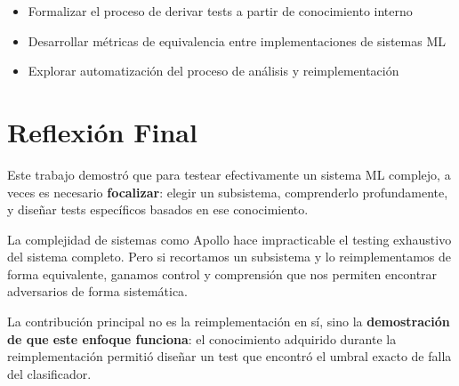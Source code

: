 \begin{itemize}
    \item Formalizar el proceso de derivar tests a partir de conocimiento interno
    \item Desarrollar métricas de equivalencia entre implementaciones de sistemas ML
    \item Explorar automatización del proceso de análisis y reimplementación
\end{itemize}

\section{Reflexión Final}

Este trabajo demostró que para testear efectivamente un sistema ML complejo, a veces es necesario \textbf{focalizar}: elegir un subsistema, comprenderlo profundamente, y diseñar tests específicos basados en ese conocimiento.

La complejidad de sistemas como Apollo hace impracticable el testing exhaustivo del sistema completo. Pero si recortamos un subsistema y lo reimplementamos de forma equivalente, ganamos control y comprensión que nos permiten encontrar adversarios de forma sistemática.

La contribución principal no es la reimplementación en sí, sino la \textbf{demostración de que este enfoque funciona}: el conocimiento adquirido durante la reimplementación permitió diseñar un test que encontró el umbral exacto de falla del clasificador.